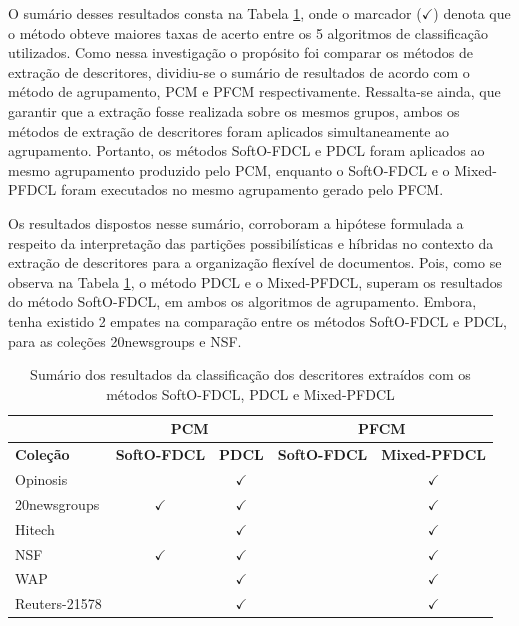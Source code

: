 O sumário desses resultados consta na Tabela \ref{table:pdclsummary}, onde o marcador ($\checkmark$)
denota que o método obteve maiores taxas de acerto entre os 5 algoritmos de classificação
utilizados. Como nessa investigação o propósito foi comparar os métodos de extração de descritores,
dividiu-se o sumário de resultados de acordo com o método de agrupamento, PCM e PFCM
respectivamente. Ressalta-se ainda, que garantir que a extração fosse realizada sobre os mesmos
grupos, ambos os
métodos de extração de descritores foram aplicados simultaneamente ao agrupamento. Portanto, os
métodos SoftO-FDCL e PDCL foram aplicados ao mesmo agrupamento produzido pelo PCM, enquanto o
SoftO-FDCL e o Mixed-PFDCL foram executados no mesmo agrupamento gerado pelo PFCM. 

Os resultados dispostos nesse sumário, corroboram a hipótese formulada a respeito da interpretação
das partições possibilísticas e híbridas no contexto da extração de descritores para a organização
flexível de documentos. Pois, como se observa na Tabela \ref{table:pdclsummary}, o método PDCL e o
Mixed-PFDCL, superam os resultados do método SoftO-FDCL, em ambos os algoritmos de agrupamento.
Embora, tenha existido 2 empates na comparação entre os métodos SoftO-FDCL e PDCL, para as coleções
20newsgroups e NSF.

\begin{table}[!htp]
  \centering
  \begin{tabular}{|l|c c|c c|}
    \hline
    & \multicolumn{2}{c|}{PCM} & \multicolumn{2}{c|}{PFCM} \\
    \hline
    {\bf Coleção} & {\bf SoftO-FDCL} & {\bf PDCL} & {\bf SoftO-FDCL} & {\bf Mixed-PFDCL} \\
    \hline
    Opinosis & & $\checkmark$ & & $\checkmark$ \\
    \hline
    20newsgroups & $\checkmark$ & $\checkmark$ & & $\checkmark$\\
    \hline
    Hitech & & $\checkmark$ & & $\checkmark$ \\
    \hline
    NSF &  $\checkmark$ & $\checkmark$ & & $\checkmark$\\
    \hline
    WAP & & $\checkmark$ & & $\checkmark$\\
    \hline
    Reuters-21578 & & $\checkmark$ & & $\checkmark$\\
    \hline
  \end{tabular}
  \caption{Sumário dos resultados da classificação dos descritores extraídos com os métodos
  SoftO-FDCL, PDCL e Mixed-PFDCL}
  \label{table:pdclsummary}
\end{table}


